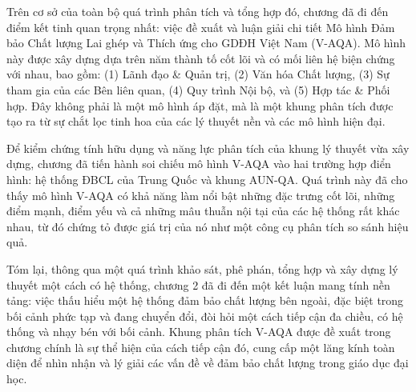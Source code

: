 \documentclass[12pt, a4paper, openany]{report}
\begin{document}
Trên cơ sở của toàn bộ quá trình phân tích và tổng hợp đó, chương đã đi đến điểm kết tinh quan trọng nhất: việc đề xuất và luận giải chi tiết Mô hình Đảm bảo Chất lượng Lai ghép và Thích ứng cho GDĐH Việt Nam (V-AQA). Mô hình này được xây dựng dựa trên năm thành tố cốt lõi và có mối liên hệ biện chứng với nhau, bao gồm: (1) Lãnh đạo \& Quản trị, (2) Văn hóa Chất lượng, (3) Sự tham gia của các Bên liên quan, (4) Quy trình Nội bộ, và (5) Hợp tác \& Phối hợp. Đây không phải là một mô hình áp đặt, mà là một khung phân tích được tạo ra từ sự chắt lọc tinh hoa của các lý thuyết nền và các mô hình hiện đại.

Để kiểm chứng tính hữu dụng và năng lực phân tích của khung lý thuyết vừa xây dựng, chương đã tiến hành soi chiếu mô hình V-AQA vào hai trường hợp điển hình: hệ thống ĐBCL của Trung Quốc và khung AUN-QA. Quá trình này đã cho thấy mô hình V-AQA có khả năng làm nổi bật những đặc trưng cốt lõi, những điểm mạnh, điểm yếu và cả những mâu thuẫn nội tại của các hệ thống rất khác nhau, từ đó chứng tỏ được giá trị của nó như một công cụ phân tích so sánh hiệu quả.

Tóm lại, thông qua một quá trình khảo sát, phê phán, tổng hợp và xây dựng lý thuyết một cách có hệ thống, chương 2 đã đi đến một kết luận mang tính nền tảng: việc thấu hiểu một hệ thống đảm bảo chất lượng bên ngoài, đặc biệt trong bối cảnh phức tạp và đang chuyển đổi, đòi hỏi một cách tiếp cận đa chiều, có hệ thống và nhạy bén với bối cảnh. Khung phân tích V-AQA được đề xuất trong chương chính là sự thể hiện của cách tiếp cận đó, cung cấp một lăng kính toàn diện để nhìn nhận và lý giải các vấn đề về đảm bảo chất lượng trong giáo dục đại học.


















\newpage
\end{document}
